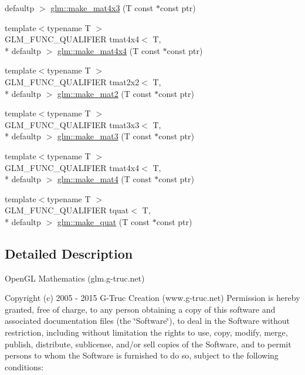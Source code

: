 \begin{DoxyCompactItemize}
defaultp $>$ \hyperlink{group__gtc__type__ptr_ga4d42daced532b33cc672280e48670a51}{glm\-::make\-\_\-mat4x3} (T const $\ast$const ptr)
\item 
{\footnotesize template$<$typename T $>$ }\\G\-L\-M\-\_\-\-F\-U\-N\-C\-\_\-\-Q\-U\-A\-L\-I\-F\-I\-E\-R tmat4x4$<$ T, \\*
defaultp $>$ \hyperlink{group__gtc__type__ptr_gaf605a5f5e2ff594e8d404b2855b09541}{glm\-::make\-\_\-mat4x4} (T const $\ast$const ptr)
\item 
{\footnotesize template$<$typename T $>$ }\\G\-L\-M\-\_\-\-F\-U\-N\-C\-\_\-\-Q\-U\-A\-L\-I\-F\-I\-E\-R tmat2x2$<$ T, \\*
defaultp $>$ \hyperlink{group__gtc__type__ptr_ga52a16e333fef7e33ca740779482a8693}{glm\-::make\-\_\-mat2} (T const $\ast$const ptr)
\item 
{\footnotesize template$<$typename T $>$ }\\G\-L\-M\-\_\-\-F\-U\-N\-C\-\_\-\-Q\-U\-A\-L\-I\-F\-I\-E\-R tmat3x3$<$ T, \\*
defaultp $>$ \hyperlink{group__gtc__type__ptr_gac2bc10c519ffc8db9e24f325f23787ea}{glm\-::make\-\_\-mat3} (T const $\ast$const ptr)
\item 
{\footnotesize template$<$typename T $>$ }\\G\-L\-M\-\_\-\-F\-U\-N\-C\-\_\-\-Q\-U\-A\-L\-I\-F\-I\-E\-R tmat4x4$<$ T, \\*
defaultp $>$ \hyperlink{group__gtc__type__ptr_ga2c6e6d457cb932e1ce683e4f690a6f60}{glm\-::make\-\_\-mat4} (T const $\ast$const ptr)
\item 
{\footnotesize template$<$typename T $>$ }\\G\-L\-M\-\_\-\-F\-U\-N\-C\-\_\-\-Q\-U\-A\-L\-I\-F\-I\-E\-R tquat$<$ T, \\*
defaultp $>$ \hyperlink{group__gtc__type__ptr_gaadafb6600af2633e4c98cc64c72f5269}{glm\-::make\-\_\-quat} (T const $\ast$const ptr)
\end{DoxyCompactItemize}


\subsection{Detailed Description}
Open\-G\-L Mathematics (glm.\-g-\/truc.\-net)

Copyright (c) 2005 -\/ 2015 G-\/\-Truc Creation (www.\-g-\/truc.\-net) Permission is hereby granted, free of charge, to any person obtaining a copy of this software and associated documentation files (the \char`\"{}\-Software\char`\"{}), to deal in the Software without restriction, including without limitation the rights to use, copy, modify, merge, publish, distribute, sublicense, and/or sell copies of the Software, and to permit persons to whom the Software is furnished to do so, subject to the following conditions\-:

